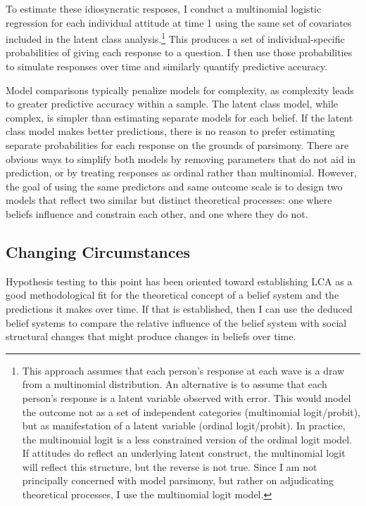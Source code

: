 \documentclass[12pt,]{article}
\begin{document}
To estimate these idiosyncratic resposes, I conduct a multinomial logistic regression for each individual attitude at time 1 using the same set of covariates included in the latent class analysis.\footnote{This approach assumes that each person's response at each wave is a draw from a multinomial distribution. An alternative is to assume that each person's response is a latent variable observed with error. This would model the outcome not as a set of independent categories (multinomial logit/probit), but as manifestation of a latent variable (ordinal logit/probit). In practice, the multinomial logit is a less constrained version of the ordinal logit model. If attitudes do reflect an underlying latent construct, the multinomial logit will reflect this structure, but the reverse is not true. Since I am not principally concerned with model parsimony, but rather on adjudicating theoretical processes, I use the multinomial logit model.} This produces a set of individual-specific probabilities of giving each response to a question. I then use those probabilities to simulate responses over time and similarly quantify predictive accuracy.

Model comparisons typically penalize models for complexity, as complexity leads to greater predictive accuracy within a sample. The latent class model, while complex, is simpler than estimating separate models for each belief. If the latent class model makes better predictions, there is no reason to prefer estimating separate probabilities for each response on the grounds of parsimony. There are obvious ways to simplify both models by removing parameters that do not aid in prediction, or by treating responses as ordinal rather than multinomial. However, the goal of using the same predictors and same outcome scale is to design two models that reflect two similar but distinct theoretical processes: one where beliefs influence and constrain each other, and one where they do not.

\hypertarget{changing-circumstances}{%
\subsection{Changing Circumstances}\label{changing-circumstances}}

Hypothesis testing to this point has been oriented toward establishing LCA as a good methodological fit for the theoretical concept of a belief system and the predictions it makes over time. If that is established, then I can use the deduced belief systems to compare the relative influence of the belief system with social structural changes that might produce changes in beliefs over time.
\end{document}
